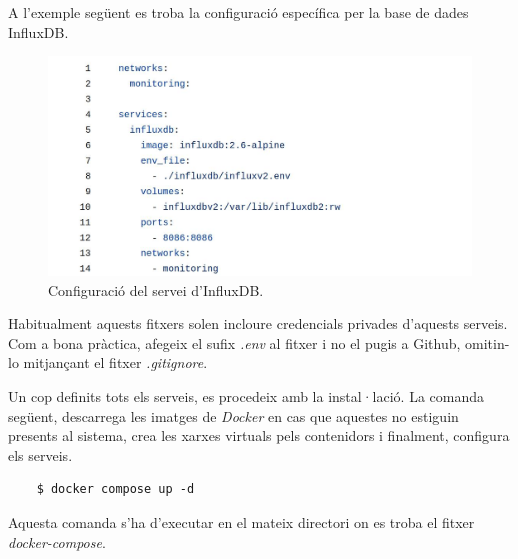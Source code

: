\clearpage

\noindent
A l'exemple següent es troba la configuració específica per la base de dades InfluxDB.

\begin{figure}[htbp]
    \centerline{\includegraphics[width=\textwidth]{figures/docker-compose-influxdb}}
    \captionsetup{justification=centering}
    \caption{Configuració del servei d'InfluxDB.}\label{fig:docker-compose-influxdb}
\end{figure}

\begin{tcolorbox}[colback=blue!5!white, colframe=blue!75!black, title=Fitxers de configuració]
    Habitualment aquests fitxers solen incloure credencials privades d'aquests serveis.
    Com a bona pràctica, afegeix el sufix \textit{.env} al fitxer i no el pugis a Github, omitin-lo mitjançant el fitxer \textit{.\gls{gitignore}}.
\end{tcolorbox}
\vspace{1em}

\noindent
Un cop definits tots els serveis, es procedeix amb la instal·lació.
La comanda següent, descarrega les imatges de \textit{\gls{Docker}} en cas que aquestes no estiguin presents al sistema,
crea les xarxes virtuals pels contenidors i finalment, configura els serveis.

\begin{verbatim}
    $ docker compose up -d
\end{verbatim}

\begin{tcolorbox}[colback=red!5!white, colframe=red!75!black, title=Atenció]
    Aquesta comanda s'ha d'executar en el mateix directori on es troba el fitxer \textit{\gls{docker-compose}}.
\end{tcolorbox}

